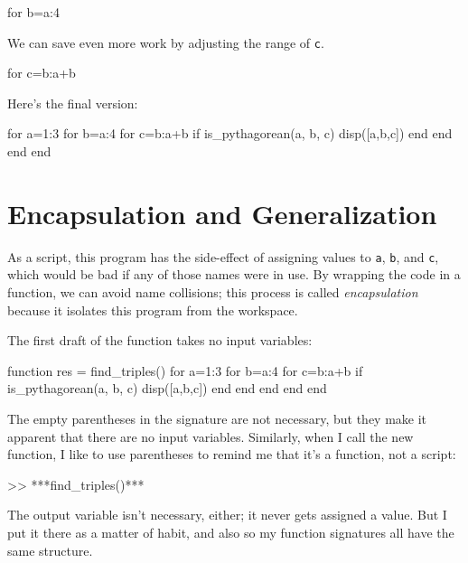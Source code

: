 \begin{code}
for b=a:4
\end{code}

We can save even more work by adjusting the range of {\tt c}.

\begin{code}
for c=b:a+b
\end{code}

Here's the final version:

\begin{code}
for a=1:3
    for b=a:4
        for c=b:a+b
            if is_pythagorean(a, b, c)
                disp([a,b,c])
            end
        end
    end
end
\end{code}

\section{Encapsulation and Generalization}

As a script, this program has the side-effect of assigning values to
{\tt a}, {\tt b}, and {\tt c}, which would be bad if any of those names were in use.  
By wrapping the code in a function, we can avoid name collisions; this process is called {\em encapsulation} because it isolates this program from the workspace.


The first draft of the function takes no input variables:

\begin{code}
function res = find_triples()
    for a=1:3
        for b=a:4
            for c=b:a+b
                if is_pythagorean(a, b, c)
                    disp([a,b,c])
                end
            end
        end
    end
end
\end{code}

The empty parentheses in the signature are not necessary, but
they make it apparent that there are no input variables.  Similarly,
when I call the new function, I like to use parentheses to remind me
that it's a function, not a script:

\begin{code}
>> ***find_triples()***
\end{code}

The output variable isn't necessary, either; it
never gets assigned a value.  But I put it there as a matter of
habit, and also so my function signatures all have the same structure.

